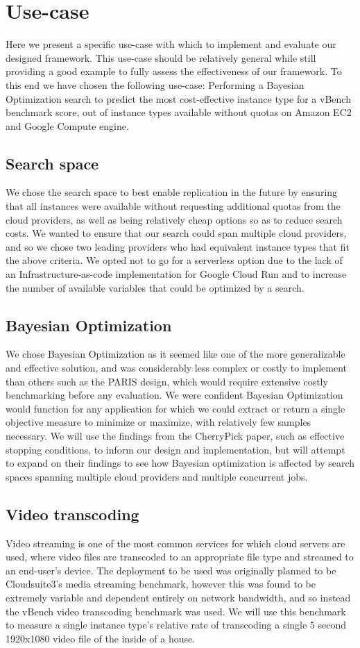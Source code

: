 \documentclass{report}
\begin{document}
\section{Use-case}
Here we present a specific use-case with which to implement and evaluate our designed framework. This use-case should be relatively general while still providing a good example to fully assess the effectiveness of our framework. To this end we have chosen the following use-case: Performing a Bayesian Optimization search to predict the most cost-effective instance type for a vBench benchmark score, out of instance types available without quotas on Amazon EC2 and Google Compute engine.
\subsection{Search space}
We chose the search space to best enable replication in the future by ensuring that all instances were available without requesting additional quotas from the cloud providers, as well as being relatively cheap options so as to reduce search costs. We wanted to ensure that our search could span multiple cloud providers, and so we chose two leading providers who had equivalent instance types that fit the above criteria. We opted not to go for a serverless option due to the lack of an Infrastructure-as-code implementation for Google Cloud Run and to increase the number of available variables that could be optimized by a search.
\subsection{Bayesian Optimization}
We chose Bayesian Optimization as it seemed like one of the more generalizable and effective solution, and was considerably less complex or costly to implement than others such as the PARIS design, which would require extensive costly benchmarking before any evaluation. We were confident Bayesian Optimization would function for any application for which we could extract or return a single objective measure to minimize or maximize, with relatively few samples necessary. We will use the findings from the CherryPick paper, such as effective stopping conditions, to inform our design and implementation, but will attempt to expand on their findings to see how Bayesian optimization is affected by search spaces spanning multiple cloud providers and multiple concurrent jobs.
\subsection{Video transcoding}
Video streaming is one of the most common services for which cloud servers are used, where video files are transcoded to an appropriate file type and streamed to an end-user's device\cite{JunXin2005a, Lottarini2018}.
The deployment to be used was originally planned to be Cloudsuite3's media streaming benchmark\cite{Palit2016}, however this was found to be extremely variable and dependent entirely on network bandwidth, and so instead the vBench video transcoding benchmark was used\cite{Lottarini2018}. We will use this benchmark to measure a single instance type's relative rate of transcoding a single 5 second 1920x1080 video file of the inside of a house.
\end{document}
